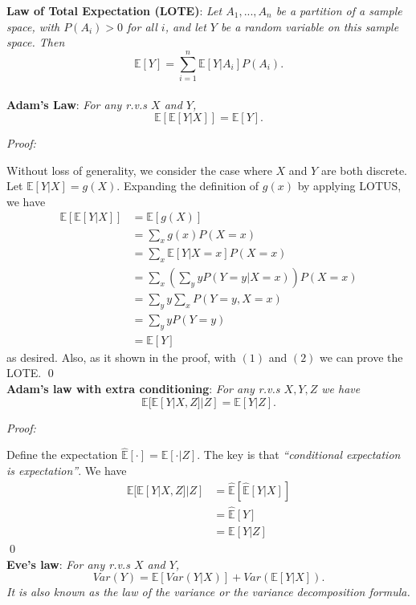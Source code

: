 \documentclass{progartcn}
\begin{document}
		\textbf{Law of Total Expectation (LOTE)}: \textit{ Let $A_1, ..., A_n$ be a partition of a sample space, with $P(A_i ) > 0$ for all $i$, and let $Y$ be a random variable on this sample space. Then}
			\[\mathbb{E}[Y]=\sum_{i=1}^n \mathbb{E}[Y|A_i]P(A_i).\]\\

		\textbf{Adam's Law}: \textit{For any r.v.s $X$ and $Y$,}
			\[\mathbb{E}[\mathbb{E}[Y|X]] = \mathbb{E}[Y].\]

			\textit{Proof:}

			Without loss of generality, we consider the case where $X$ and $Y$ are both discrete. Let $\mathbb{E}[Y|X]=g(X)$. Expanding the definition of $g(x)$ by applying LOTUS, we have
			\begin{align*}
			\mathbb{E}[\mathbb{E}[Y|X]]&=\mathbb{E}[g(X)]\\
			&=\sum_x g(x)P(X=x)\\
			&=\sum_x \mathbb{E}[Y|X=x] P(X=x)\tag{1}\\
			&=\sum_x\left(\sum_y y P(Y=y|X=x)\right)P(X=x)\\
			&=\sum_y y \sum_x P(Y=y,X=x)\\
			&=\sum_y y P(Y=y)\\
			&=\mathbb{E}[Y]\tag{2}
			\end{align*}
			as desired. Also, as it shown in the proof, with $(1)$ and $(2)$ we can prove the LOTE.
			\qed\\

		\textbf{Adam's law with extra conditioning}: \textit{For any r.v.s $X,Y,Z$ we have}
			\[\mathbb{E}[\mathbb{E}[Y|X,Z]|Z]=\mathbb{E}[Y|Z].\]

			\textit{Proof:}

			Define the expectation $\hat{\mathbb{E}}[\cdot ] =\mathbb{E}[\cdot | Z]$. The key is that \textit{``conditional expectation is expectation''}. We have
			\begin{align*}
			\mathbb{E}[\mathbb{E}[Y|X,Z]|Z]&=\hat{\mathbb{E}}[\hat{\mathbb{E}}[Y|X]]\\
			&=\hat{\mathbb{E}}[Y] \tag{by Adam's Law}\\
			&=\mathbb{E}[Y|Z]
			\end{align*}
			\qed\\

			\textbf{Eve's law}: \textit{ For any r.v.s $X$ and $Y$,}
			\[Var(Y)=\mathbb{E}[Var(Y|X)]+Var(\mathbb{E}[Y|X]).\]
			\textit{It is also known as the law of the variance or the variance decomposition formula.}
\end{document}
